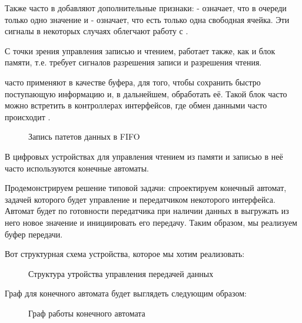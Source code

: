 \par{Также часто в  добавляют дополнительные признаки:  - означает, что в очереди только одно значение и  - означает, что есть только одна свободная ячейка. Эти сигналы в некоторых случаях облегчают работу с .}

\par{С точки зрения управления записью и чтением,  работает также, как и блок  памяти, т.е. требует сигналов разрешения записи и разрешения чтения.}

\vspace{4mm}

\par{ часто применяют в качестве буфера, для того, чтобы сохранить быстро поступающую информацию и, в дальнейшем, обработать её. Такой блок часто можно встретить в контроллерах интерфейсов, где обмен данными часто происходит .}

\begin{figure}[H]
	\centering
	\def\svgwidth{\columnwidth}
	
	\caption{Запись патетов данных в FIFO}
\end{figure}

\par{В цифровых устройствах для управления чтением из памяти и записью в неё часто используются конечные автоматы.}

\par{Продемонстрируем решение типовой задачи: спроектируем конечный автомат, задачей которого будет управление  и передатчиком некоторого интерфейса. Автомат будет по готовности передатчика при наличии данных в  выгружать из него новое значение и инициировать его передачу. Таким образом, мы реализуем буфер передачи.}

\vspace{4mm}

\par{Вот структурная схема устройства, которое мы хотим реализовать:}

\begin{figure}[H]
	\centering
	\def\svgwidth{\columnwidth}
	
	\caption{Структура утройства управления передачей данных}
\end{figure}

\par{Граф для конечного автомата будет выглядеть следующим образом:}

\begin{figure}[H]
	\centering
	\def\svgwidth{\columnwidth}
	
	\caption{Граф работы конечного автомата}
\end{figure}

